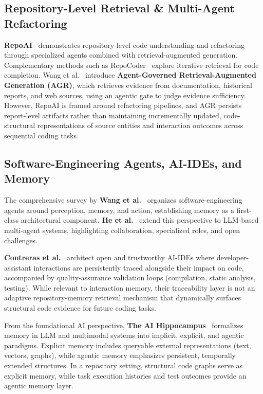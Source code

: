 \documentclass[conference]{IEEEtran}
\begin{document}
\subsection{Repository-Level Retrieval \& Multi-Agent Refactoring}
\textbf{RepoAI}~\cite{chondamrongkul2026repoai} demonstrates repository-level code understanding and refactoring through specialized agents combined with retrieval-augmented generation. Complementary methods such as RepoCoder~\cite{zhang2023repocoder} explore iterative retrieval for code completion. Wang et al.~\cite{wang2026agr} introduce \textbf{Agent-Governed Retrieval-Augmented Generation (AGR)}, which retrieves evidence from documentation, historical reports, and web sources, using an agentic gate to judge evidence sufficiency. However, RepoAI is framed around refactoring pipelines, and AGR persists report-level artifacts rather than maintaining incrementally updated, code-structural representations of source entities and interaction outcomes across sequential coding tasks.

\subsection{Software-Engineering Agents, AI-IDEs, and Memory}
The comprehensive survey by \textbf{Wang et al.}~\cite{wang2025agents} organizes software-engineering agents around perception, memory, and action, establishing memory as a first-class architectural component. \textbf{He et al.}~\cite{he2025multiagent} extend this perspective to LLM-based multi-agent systems, highlighting collaboration, specialized roles, and open challenges. 

\textbf{Contreras et al.}~\cite{contreras2026aiides} architect open and trustworthy AI-IDEs where developer-assistant interactions are persistently traced alongside their impact on code, accompanied by quality-assurance validation loops (compilation, static analysis, testing). While relevant to interaction memory, their traceability layer is not an adaptive repository-memory retrieval mechanism that dynamically surfaces structural code evidence for future coding tasks.

From the foundational AI perspective, \textbf{The AI Hippocampus}~\cite{jia2025hippocampus} formalizes memory in LLM and multimodal systems into implicit, explicit, and agentic paradigms. Explicit memory includes queryable external representations (text, vectors, graphs), while agentic memory emphasizes persistent, temporally extended structures. In a repository setting, structural code graphs serve as explicit memory, while task execution histories and test outcomes provide an agentic memory layer.
\end{document}
